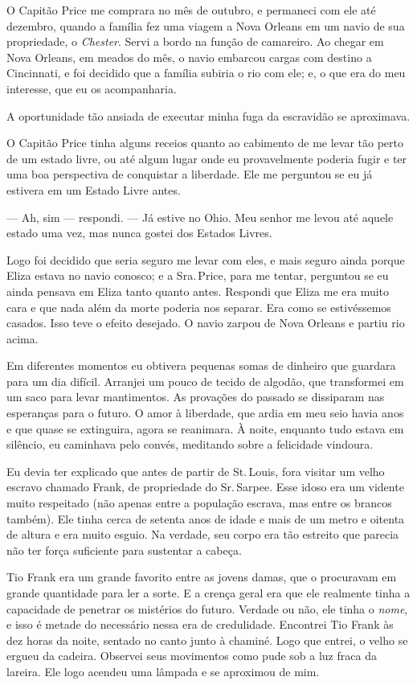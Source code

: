 O Capitão Price me comprara no mês de outubro, e permaneci com ele até
dezembro, quando a família fez uma viagem a Nova Orleans em um navio de
sua propriedade, o \emph{Chester}. Servi a bordo na função de camareiro.
Ao chegar em Nova Orleans, em meados do mês, o navio embarcou cargas com
destino a Cincinnati, e foi decidido que a família subiria o rio com
ele; e, o que era do meu interesse, que eu os acompanharia.

A oportunidade tão ansiada de executar minha fuga da escravidão se
aproximava.

O Capitão Price tinha alguns receios quanto ao cabimento de me levar tão
perto de um estado livre, ou até algum lugar onde eu provavelmente
poderia fugir e ter uma boa perspectiva de conquistar a liberdade. Ele
me perguntou se eu já estivera em um Estado Livre antes.

--- Ah, sim --- respondi. --- Já estive no Ohio. Meu senhor me levou até
aquele estado uma vez, mas nunca gostei dos Estados Livres.

Logo foi decidido que seria seguro me levar com eles, e mais seguro
ainda porque Eliza estava no navio conosco; e a Sra.\,Price, para me
tentar, perguntou se eu ainda pensava em Eliza tanto quanto antes.
Respondi que Eliza me era muito cara e que nada além da morte poderia
nos separar. Era como se estivéssemos casados. Isso teve o efeito
desejado. O navio zarpou de Nova Orleans e partiu rio acima.

Em diferentes momentos eu obtivera pequenas somas de dinheiro que
guardara para um dia difícil. Arranjei um pouco de tecido de algodão,
que transformei em um saco para levar mantimentos. As provações do
passado se dissiparam nas esperanças para o futuro. O amor à liberdade,
que ardia em meu seio havia anos e que quase se extinguira, agora se
reanimara. À noite, enquanto tudo estava em silêncio, eu caminhava pelo
convés, meditando sobre a felicidade vindoura.

Eu devia ter explicado que antes de partir de St.\,Louis, fora visitar um
velho escravo chamado Frank, de propriedade do Sr.\,Sarpee. Esse idoso
era um vidente muito respeitado (não apenas entre a população escrava,
mas entre os brancos também). Ele tinha cerca de setenta anos de idade e
mais de um metro e oitenta de altura e era muito esguio. Na verdade, seu
corpo era tão estreito que parecia não ter força suficiente para
sustentar a cabeça.

Tio Frank era um grande favorito entre as jovens damas, que o procuravam
em grande quantidade para ler a sorte. E a crença geral era que ele
realmente tinha a capacidade de penetrar os mistérios do futuro. Verdade
ou não, ele tinha o \emph{nome}, e isso é metade do necessário nessa era
de credulidade. Encontrei Tio Frank às dez horas da noite, sentado no
canto junto à chaminé. Logo que entrei, o velho se ergueu da cadeira.
Observei seus movimentos como pude sob a luz fraca da lareira. Ele logo
acendeu uma lâmpada e se aproximou de mim.

